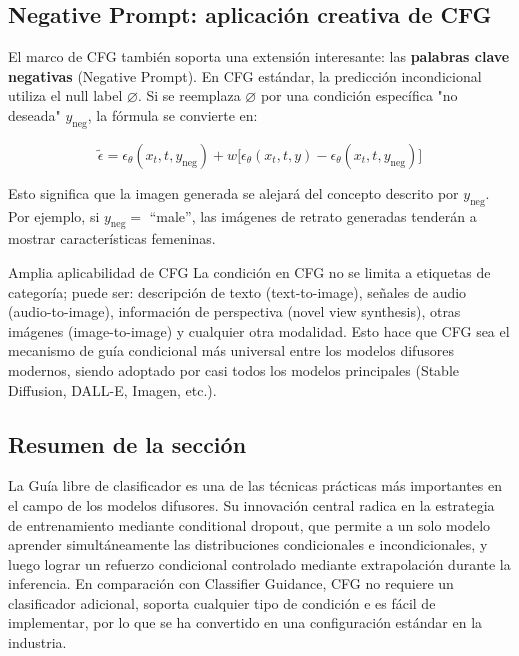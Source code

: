 \documentclass[a4paper]{article}
\begin{document}
\subsection{Negative Prompt: aplicación creativa de CFG}

El marco de CFG también soporta una extensión interesante: las \textbf{palabras clave negativas} (Negative Prompt). En CFG estándar, la predicción incondicional utiliza el null label $\varnothing$. Si se reemplaza $\varnothing$ por una condición específica "no deseada" $y_{\text{neg}}$, la fórmula se convierte en:

$$
\tilde{\epsilon} = \epsilon_\theta(x_t, t, y_{\text{neg}}) + w\bigl[\epsilon_\theta(x_t, t, y) - \epsilon_\theta(x_t, t, y_{\text{neg}})\bigr]
$$

Esto significa que la imagen generada se alejará del concepto descrito por $y_{\text{neg}}$. Por ejemplo, si $y_{\text{neg}} =$ ``male'', las imágenes de retrato generadas tenderán a mostrar características femeninas.

\begin{knowledgebox}{Amplia aplicabilidad de CFG}
La condición en CFG no se limita a etiquetas de categoría; puede ser: descripción de texto (text-to-image), señales de audio (audio-to-image), información de perspectiva (novel view synthesis), otras imágenes (image-to-image) y cualquier otra modalidad. Esto hace que CFG sea el mecanismo de guía condicional más universal entre los modelos difusores modernos, siendo adoptado por casi todos los modelos principales (Stable Diffusion, DALL-E, Imagen, etc.).
\end{knowledgebox}

\subsection{Resumen de la sección}

La Guía libre de clasificador es una de las técnicas prácticas más importantes en el campo de los modelos difusores. Su innovación central radica en la estrategia de entrenamiento mediante conditional dropout, que permite a un solo modelo aprender simultáneamente las distribuciones condicionales e incondicionales, y luego lograr un refuerzo condicional controlado mediante extrapolación durante la inferencia. En comparación con Classifier Guidance, CFG no requiere un clasificador adicional, soporta cualquier tipo de condición e es fácil de implementar, por lo que se ha convertido en una configuración estándar en la industria.
\end{document}
